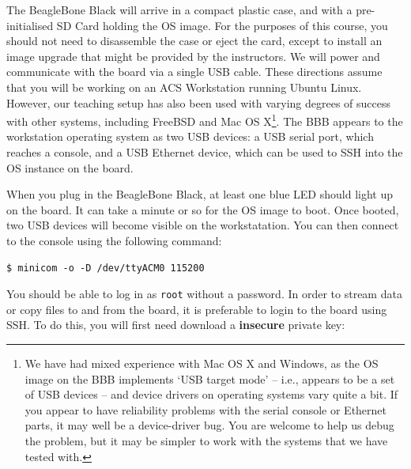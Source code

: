 \documentclass[a4paper,10pt]{article}
\newcommand{\code}[1]{\texttt{\small #1}}
\begin{document}
The BeagleBone Black will arrive in a compact plastic case, and with a
pre-initialised SD Card holding the OS image.
For the purposes of this course, you should not need to disassemble the case
or eject the card, except to install an image upgrade that might be provided
by the instructors.
We will power and communicate with the board via a single USB cable.
These directions assume that you will be working on an ACS Workstation running
Ubuntu Linux.
However, our teaching setup has also been used with varying degrees of success
with other systems, including FreeBSD and Mac OS X\footnote{We have had mixed
experience with Mac OS X and Windows, as the OS image on the BBB implements
`USB target mode' -- i.e., appears to be a set of USB devices -- and device
drivers on operating systems vary quite a bit.
If you appear to have reliability problems with the serial console or Ethernet
parts, it may well be a device-driver bug.
You are welcome to help us debug the problem, but it may be simpler to work
with the systems that we have tested with.}.
The BBB appears to the workstation operating system as two USB devices: a USB
serial port, which reaches a console, and a USB Ethernet device, which can be
used to SSH into the OS instance on the board.



When you plug in the BeagleBone Black, at least one blue LED should light up
on the board.
It can take a minute or so for the OS image to boot. Once booted, two USB
devices will become visible on the workstatation. You can then connect to the 
console using the following command:

\begin{small}
\begin{verbatim}
$ minicom -o -D /dev/ttyACM0 115200
\end{verbatim}
\end{small}

You should be able to log in as \code{root} without a password. In order
to stream data or copy files to and from the board, it is preferable to 
login to the board using SSH.
To do this, you will first need download a \textbf{insecure} private key:
\end{document}
